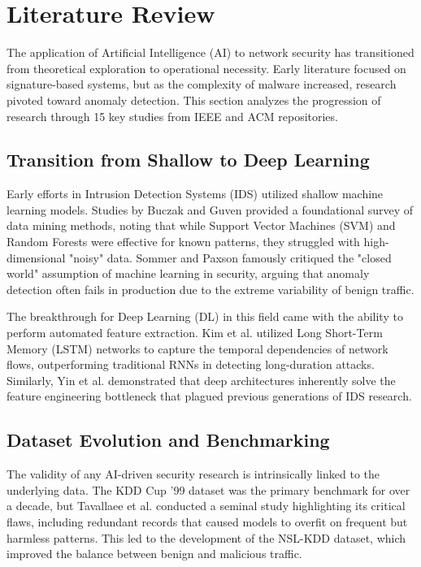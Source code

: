 \documentclass[10pt, conference, compsocconf, letterpaper, twocolumn, twoside]{IEEEtran}
\begin{document}
\section{Literature Review}
The application of Artificial Intelligence (AI) to network security has transitioned from theoretical exploration to operational necessity. Early literature focused on signature-based systems, but as the complexity of malware increased, research pivoted toward anomaly detection. This section analyzes the progression of research through 15 key studies from IEEE and ACM repositories.

\subsection{Transition from Shallow to Deep Learning}
Early efforts in Intrusion Detection Systems (IDS) utilized shallow machine learning models. Studies by Buczak and Guven \cite{buczak2016} provided a foundational survey of data mining methods, noting that while Support Vector Machines (SVM) and Random Forests were effective for known patterns, they struggled with high-dimensional "noisy" data. Sommer and Paxson \cite{sommer2010} famously critiqued the "closed world" assumption of machine learning in security, arguing that anomaly detection often fails in production due to the extreme variability of benign traffic.

The breakthrough for Deep Learning (DL) in this field came with the ability to perform automated feature extraction. Kim et al. \cite{kim2016} utilized Long Short-Term Memory (LSTM) networks to capture the temporal dependencies of network flows, outperforming traditional RNNs in detecting long-duration attacks. Similarly, Yin et al. \cite{yin2017} demonstrated that deep architectures inherently solve the feature engineering bottleneck that plagued previous generations of IDS research.

\subsection{Dataset Evolution and Benchmarking}
The validity of any AI-driven security research is intrinsically linked to the underlying data. The KDD Cup '99 dataset was the primary benchmark for over a decade, but Tavallaee et al. \cite{tavallaee2009} conducted a seminal study highlighting its critical flaws, including redundant records that caused models to overfit on frequent but harmless patterns. This led to the development of the NSL-KDD dataset, which improved the balance between benign and malicious traffic.
\end{document}
